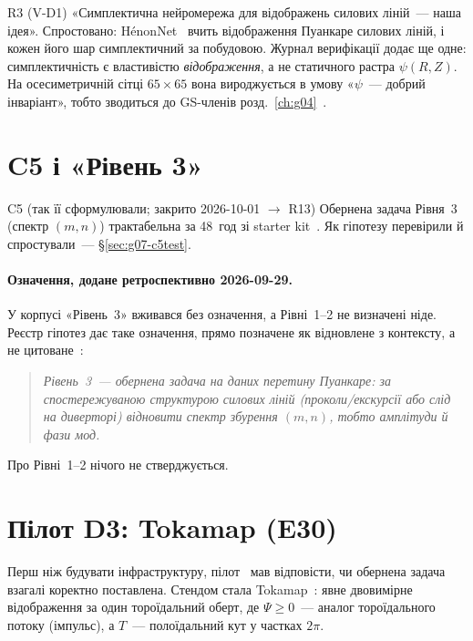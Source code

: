 \begin{refuted}{R3 (V-D1)}
«Симплектична нейромережа для відображень силових ліній~--- наша ідея». Спростовано: HénonNet~\cite{Burby2021} вчить відображення Пуанкаре силових ліній, і кожен його шар симплектичний за побудовою. Журнал верифікації додає ще одне: симплектичність є властивістю \emph{відображення}, а не статичного растра $\psi(R,Z)$. На осесиметричній сітці $65\times65$ вона вироджується в умову «$\psi$~--- добрий інваріант», тобто зводиться до GS-членів розд.~\ref{ch:g04}~\cite{RegVerif}.
\end{refuted}

\section{C5 і «Рівень 3»}\label{sec:g07-c5}

\begin{conjecture}{C5 (так її сформулювали; закрито 2026-10-01 $\to$ R13)}
Обернена задача Рівня~3 (спектр $(m,n)$) трактабельна за 48~год зі starter kit~\cite{RegConj}. Як гіпотезу перевірили й спростували~--- \S\ref{sec:g07-c5test}.
\end{conjecture}

\paragraph{Означення, додане ретроспективно 2026-09-29.} У корпусі «Рівень~3» вживався без означення, а Рівні~1--2 не визначені ніде. Реєстр гіпотез дає таке означення, прямо позначене як відновлене з контексту, а не цитоване~\cite{RegConj}:

\begin{quote}\itshape
Рівень~3~--- обернена задача на даних перетину Пуанкаре: за спостережуваною структурою силових ліній (проколи/екскурсії або слід на диверторі) відновити спектр збурення $(m,n)$, тобто амплітуди й фази мод.
\end{quote}

\noindent Про Рівні~1--2 нічого не стверджується.

\section{Пілот D3: Tokamap (E30)}\label{sec:g07-tokamap}

Перш ніж будувати інфраструктуру, пілот~\cite{g07D3} мав відповісти, чи обернена задача взагалі коректно поставлена. Стендом стала Tokamap~\cite{Balescu1998}: явне двовимірне відображення за один тороїдальний оберт, де $\Psi\ge0$~--- аналог тороїдального потоку (імпульс), а $T$~--- полоїдальний кут у частках $2\pi$.

